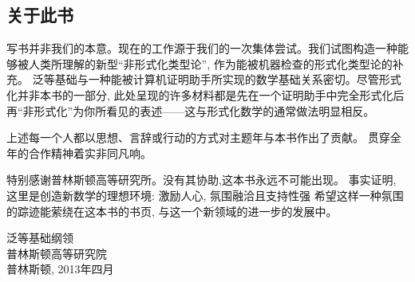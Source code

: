 \subsection*{关于此书}

写书并非我们的本意。现在的工作源于我们的一次集体尝试。我们试图构造一种能够被人类所理解的新型“非形式化类型论”, 作为能被机器检查的形式化类型论的补充。
泛等基础与一种能被计算机证明助手所实现的数学基础关系密切。尽管形式化并非本书的一部分, 此处呈现的许多材料都是先在一个证明助手中完全形式化后
再“非形式化”为你所看见的表述——这与形式化数学的通常做法明显相反。

上述每一个人都以思想、言辞或行动的方式对主题年与本书作出了贡献。
贯穿全年的合作精神着实非同凡响。

\mentalpause

特别感谢普林斯顿高等研究所。没有其协助,这本书永远不可能出现。
事实证明, 这里是创造新数学的理想环境: 激励人心, 氛围融洽且支持性强
希望这样一种氛围的踪迹能萦绕在这本书的书页, 与这一个新领域的进一步的发展中。

\bigskip

\begin{flushright}
泛等基础纲领\\
普林斯顿高等研究院\\
普林斯顿, 2013年四月
\end{flushright}

